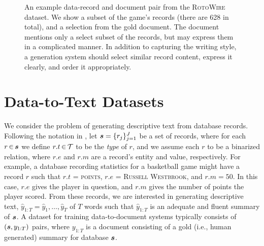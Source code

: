 \documentclass[11pt,letterpaper]{article}
\begin{document}
\begin{figure*}
{
}
\caption{An example data-record and document pair from the \textsc{RotoWire}
  dataset. We show a subset of the game's records (there
  are 628 in total), and a selection from the gold document. The document mentions only a select subset of the records, but may
  express them in a complicated manner. In
  addition to capturing the writing style, a generation system should select similar record content, express it clearly, and order it
  appropriately.
}
\label{fig:samplesummary}
\end{figure*}

\section{Data-to-Text Datasets}

We consider the problem of generating descriptive text from database
records. Following the
notation in \citet{liang2009learning}, let $\boldsymbol{s} = \{r_j\}_{j=1}^J$
be a set of records, where for each $r \, {\in} \, \boldsymbol{s}$ we define
$r.t \, {\in} \, \mathcal{T}$ to be the \textit{type} of $r$, and we assume each $r$ to be a binarized
relation, where $r.e$ and $r.m$ are a record's entity
and value, respectively. For example, a database recording statistics for a basketball game might have a record $r$ such that $r.t$ =
\textsc{points}, $r.e$ = \textsc{Russell Westbrook}, and $r.m=50$. In this case, $r.e$ gives the
player in question, and $r.m$ gives the
number of points the player scored. From these records, we are interested in generating descriptive text, $\hat{y}_{1:T} = \hat{y}_1, \ldots, \hat{y}_T$ of $T$ words such that $\hat{y}_{1:T}$ is an adequate and fluent summary of $\boldsymbol{s}$. A dataset for training data-to-document systems typically consists of $(\boldsymbol{s}, y_{1:T})$ pairs, where $y_{1:T}$ is a document consisting of a gold (i.e., human generated) summary for database $\boldsymbol{s}$.
\end{document}
